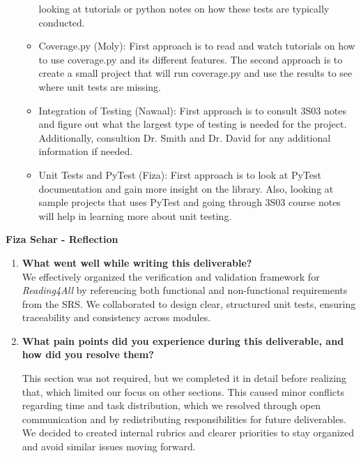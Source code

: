 \documentclass[12pt, titlepage]{article}
\begin{document}
\begin{enumerate}
\begin{itemize}
    looking at tutorials or python notes on how these tests are typically conducted. 
    \item Coverage.py (Moly): First approach is to read and watch tutorials on how to use coverage.py and its different
    features. The second approach is to create a small project that will run coverage.py and use the results to see where
    unit tests are missing.
    \item Integration of Testing (Nawaal): First approach is to consult 3S03 notes and figure out what the largest type of testing 
    is needed for the project. Additionally, consultion Dr. Smith and Dr. David for any additional information if needed.
    \item Unit Tests and PyTest (Fiza): First approach is to look at PyTest documentation and gain more insight on the library. Also,
    looking at sample projects that uses PyTest and going through 3S03 course notes will help in learning more about unit testing.
  \end{itemize}
\end{enumerate}


\textbf{Fiza Sehar - Reflection}
\begin{enumerate}
  \item \textbf{What went well while writing this deliverable?}\\

    We effectively organized the verification and validation framework
    for \textit{Reading4All} by referencing both functional and
    non-functional requirements from the SRS. We collaborated to design
    clear, structured unit tests, ensuring traceability and consistency
    across modules.

    \item \textbf{What pain points did you experience during this
    deliverable, and how did you resolve them?}\

    This section was not required, but we completed it in detail before
    realizing that, which limited our focus on other sections. This
    caused minor conflicts regarding time and task distribution, which
    we resolved through open communication and by redistributing
    responsibilities for future deliverables. We decided to created
    internal rubrics and clearer priorities to stay organized and avoid
    similar issues moving forward.

\end{enumerate}
\end{document}
